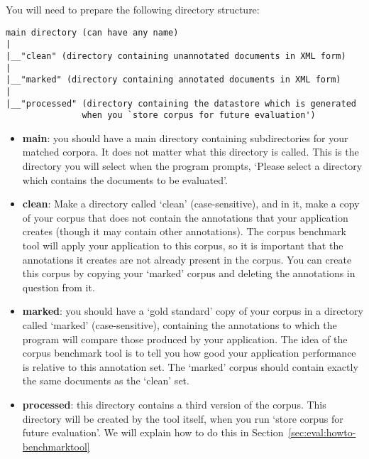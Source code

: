 
You will need to prepare the following directory structure:

\begin{small}
\begin{verbatim}
main directory (can have any name)
|
|__"clean" (directory containing unannotated documents in XML form)
|
|__"marked" (directory containing annotated documents in XML form)
|
|__"processed" (directory containing the datastore which is generated
               when you `store corpus for future evaluation')
\end{verbatim}\end{small}

\begin{itemize}
  
\item {\bf main}: you should have a main directory containing subdirectories for
  your matched corpora. It does not matter what this directory is called. This
  is the directory you will select when the program prompts, `Please select a
  directory which contains the documents to be evaluated'.

\item {\bf clean}: Make a directory called `clean' (case-sensitive), and in it,
make a copy of your corpus that does not contain the annotations that your
application creates (though it may contain other annotations). The corpus
benchmark tool will apply your application to this corpus, so it is important
that the annotations it creates are not already present in the corpus. You can
create this corpus by copying your `marked' corpus and deleting the annotations
in question from it.

\item {\bf marked}: you should have a `gold standard' copy of your corpus in a
directory called `marked' (case-sensitive), containing the annotations to which
the program will compare those produced by your application. The idea of the
corpus benchmark tool is to tell you how good your application performance is relative
to this annotation set. The `marked' corpus should contain exactly the same
documents as the `clean' set.

\item {\bf processed}: this directory contains a third version of the corpus.
This directory will be created by the tool itself, when you run `store corpus for
future evaluation'. We will explain how to do this in
Section~\ref{sec:eval:howto-benchmarktool}

\end{itemize}

